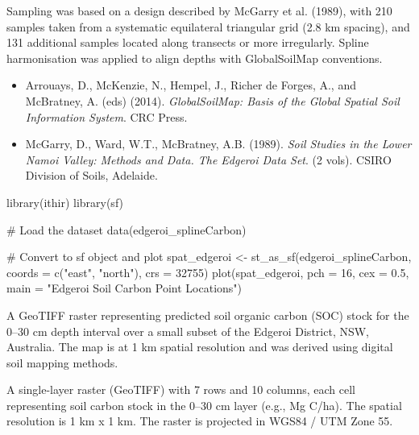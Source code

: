 \documentclass[a4paper]{book}
\begin{document}
%
\begin{Details}
Sampling was based on a design described by McGarry et al. (1989), with 210 samples taken from a systematic equilateral triangular grid (2.8 km spacing), and 131 additional samples located along transects or more irregularly. Spline harmonisation was applied to align depths with GlobalSoilMap conventions.
\end{Details}
%
\begin{References}
\begin{itemize}

\item{} Arrouays, D., McKenzie, N., Hempel, J., Richer de Forges, A., and McBratney, A. (eds) (2014). \emph{GlobalSoilMap: Basis of the Global Spatial Soil Information System}. CRC Press.
\item{} McGarry, D., Ward, W.T., McBratney, A.B. (1989). \emph{Soil Studies in the Lower Namoi Valley: Methods and Data. The Edgeroi Data Set}. (2 vols). CSIRO Division of Soils, Adelaide.

\end{itemize}

\end{References}
%
\begin{Examples}
\begin{ExampleCode}
library(ithir)
library(sf)

# Load the dataset
data(edgeroi_splineCarbon)

# Convert to sf object and plot
spat_edgeroi <- st_as_sf(edgeroi_splineCarbon, coords = c("east", "north"), crs = 32755)
plot(spat_edgeroi, pch = 16, cex = 0.5, main = "Edgeroi Soil Carbon Point Locations")
\end{ExampleCode}
\end{Examples}
%
\begin{Description}
A GeoTIFF raster representing predicted soil organic carbon (SOC) stock for the 0–30 cm depth interval over a small subset of the Edgeroi District, NSW, Australia. The map is at 1 km spatial resolution and was derived using digital soil mapping methods.
\end{Description}
%
\begin{Format}
A single-layer raster (GeoTIFF) with 7 rows and 10 columns, each cell representing soil carbon stock in the 0–30 cm layer (e.g., Mg C/ha). The spatial resolution is 1 km x 1 km. The raster is projected in WGS84 / UTM Zone 55.
\end{Format}
\end{document}
